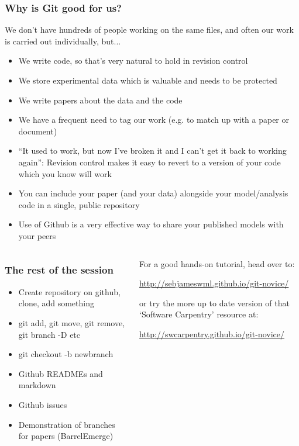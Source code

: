 \documentclass{beamer}
\begin{document}
\begin{frame}
  \frametitle{Why is Git good for us?}
  We don't have hundreds of people working on the same files, and
  often our work is carried out individually, but...
  \begin{itemize}
    \pause \item We write code, so that's very natural to hold in
    revision control
    \pause \item We store experimental data which is valuable and needs to be
    protected
    \pause \item We write papers about the data and the code
    \pause \item We have a frequent need to \alert{tag} our work (e.g. to
    match up with a paper or document)
    \pause \item ``It used to work, but now I've broken it and I can't
    get it back to working again'': Revision control makes it easy to
    revert to a version of your code which you know will work
    \pause \item You can include your paper (and your data) alongside your model/analysis code
    in a single, public repository
    \item Use of Github is a very effective way to share your
    published models with your peers
  \end{itemize}
\end{frame}

\begin{frame}
  \begin{columns}[T]
    \begin{column}{.5\textwidth}
      \frametitle{The rest of the session}
      \begin{itemize}
      \item Create repository on github, clone, add something
      \item git add, git move, git remove, git branch -D etc
      \item git checkout -b newbranch
      \item Github READMEs and markdown
      \item Github issues
      \item Demonstration of branches for papers (BarrelEmerge)
      \end{itemize}
    \end{column}
    \begin{column}{.5\textwidth}

      For a good hands-on tutorial, head over to:

      \url{http://sebjameswml.github.io/git-novice/}

      or try the more up to date version of that `Software Carpentry' resource
      at:

      \url{http://swcarpentry.github.io/git-novice/}

    \end{column}
  \end{columns}
\end{frame}
\end{document}

